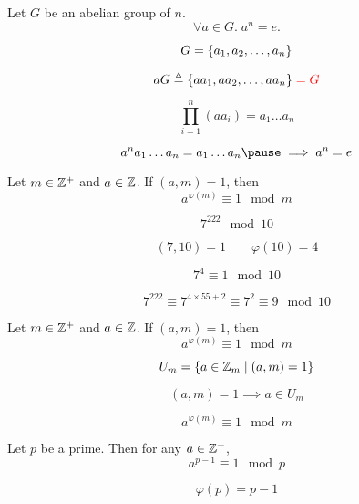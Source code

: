 \begin{frame}
  \begin{theorem}
    Let $G$ be an abelian group of  $n$.
    \[
      \forall a \in G.\; a^n = e.
    \]
  \end{theorem}

  \pause
  \[
    G = \{a_{1}, a_{2}, \dots, a_{n}\}
  \]

  \pause
  \[
    aG \triangleq \{aa_{1}, aa_{2}, \dots, aa_{n}\} \;\textcolor{red}{= G}
  \]

  \pause
  \[
    \prod_{i=1}^{n} (a a_i) = a_{1} \dots a_{n}
  \]

  \pause
  \[
    a^{n} a_{1} \dots a_{n} = a_{1} \dots a_{n} \pause \implies a^{n} = e
  \]
\end{frame}

\begin{frame}
  \begin{theorem}
    Let $m \in \mathbb{Z}^{+}$ and $a \in \mathbb{Z}$.
    If $(a, m) = 1$, then
    \[
      a^{\varphi(m)} \equiv 1 \mod{m}
    \]
  \end{theorem}

  \pause
  \[
    7^{222} \mod{10}
  \]

  \pause
  \[
    (7, 10) = 1 \qquad \varphi(10) = 4
  \]

  \pause
  \[
    7^{4} \equiv 1 \mod{10}
  \]

  \pause
  \[
    7^{222} \equiv 7^{4 \times 55 + 2} \equiv 7^{2} \equiv 9 \mod{10}
  \]
\end{frame}

\begin{frame}
  \begin{theorem}
    Let $m \in \mathbb{Z}^{+}$ and $a \in \mathbb{Z}$.
    If $(a, m) = 1$, then
    \[
      a^{\varphi(m)} \equiv 1 \mod{m}
    \]
  \end{theorem}

  \pause
  \vspace{0.30cm}
  \[
    U_{m} = \{a \in \mathbb{Z}_{m} \mid (a, m) = 1\}
  \]

  \pause
  \[
    (a, m) = 1 \implies a \in U_{m}
  \]

  \pause
  \[
    a^{\varphi(m)} \equiv 1 \mod{m}
  \]
\end{frame}

\begin{frame}
  \begin{theorem}
    Let $p$ be a prime. Then for any $a \in \mathbb{Z}^{+}$,
    \[
      a^{p-1} \equiv 1 \mod{p}
    \]
  \end{theorem}

  \pause
  \[
    \varphi(p) = p - 1
  \]
\end{frame}
